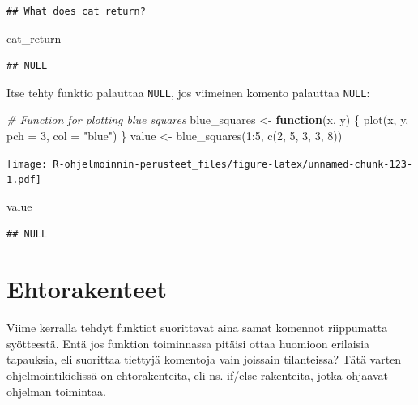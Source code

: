 \documentclass[
]{book}
\newenvironment{Shaded}{\begin{snugshade}}{\end{snugshade}}
\newcommand{\AttributeTok}[1]{\textcolor[rgb]{0.77,0.63,0.00}{#1}}
\newcommand{\CommentTok}[1]{\textcolor[rgb]{0.56,0.35,0.01}{\textit{#1}}}
\newcommand{\ControlFlowTok}[1]{\textcolor[rgb]{0.13,0.29,0.53}{\textbf{#1}}}
\newcommand{\DecValTok}[1]{\textcolor[rgb]{0.00,0.00,0.81}{#1}}
\newcommand{\FunctionTok}[1]{\textcolor[rgb]{0.00,0.00,0.00}{#1}}
\newcommand{\NormalTok}[1]{#1}
\newcommand{\OtherTok}[1]{\textcolor[rgb]{0.56,0.35,0.01}{#1}}
\newcommand{\SpecialCharTok}[1]{\textcolor[rgb]{0.00,0.00,0.00}{#1}}
\newcommand{\StringTok}[1]{\textcolor[rgb]{0.31,0.60,0.02}{#1}}
\begin{document}
\begin{verbatim}
## What does cat return?
\end{verbatim}

\begin{Shaded}
\begin{Highlighting}[]
\NormalTok{cat\_return}
\end{Highlighting}
\end{Shaded}

\begin{verbatim}
## NULL
\end{verbatim}

Itse tehty funktio palauttaa \texttt{NULL}, jos viimeinen komento palauttaa \texttt{NULL}:

\begin{Shaded}
\begin{Highlighting}[]
\CommentTok{\# Function for plotting blue squares}
\NormalTok{blue\_squares }\OtherTok{\textless{}{-}} \ControlFlowTok{function}\NormalTok{(x, y) \{}
  \FunctionTok{plot}\NormalTok{(x, y, }\AttributeTok{pch =} \DecValTok{3}\NormalTok{, }\AttributeTok{col =} \StringTok{"blue"}\NormalTok{)}
\NormalTok{\}}
\NormalTok{value }\OtherTok{\textless{}{-}} \FunctionTok{blue\_squares}\NormalTok{(}\DecValTok{1}\SpecialCharTok{:}\DecValTok{5}\NormalTok{, }\FunctionTok{c}\NormalTok{(}\DecValTok{2}\NormalTok{, }\DecValTok{5}\NormalTok{, }\DecValTok{3}\NormalTok{, }\DecValTok{3}\NormalTok{, }\DecValTok{8}\NormalTok{))}
\end{Highlighting}
\end{Shaded}

\texttt{[image: R-ohjelmoinnin-perusteet\_files/figure-latex/unnamed-chunk-123-1.pdf]}

\begin{Shaded}
\begin{Highlighting}[]
\NormalTok{value}
\end{Highlighting}
\end{Shaded}

\begin{verbatim}
## NULL
\end{verbatim}

\hypertarget{ifelse}{%
\chapter{Ehtorakenteet}\label{ifelse}}

Viime kerralla tehdyt funktiot suorittavat aina samat komennot riippumatta syötteestä. Entä jos funktion toiminnassa pitäisi ottaa huomioon erilaisia tapauksia, eli suorittaa tiettyjä komentoja vain joissain tilanteissa? Tätä varten ohjelmointikielissä on ehtorakenteita, eli ns. if/else-rakenteita, jotka ohjaavat ohjelman toimintaa.
\end{document}
